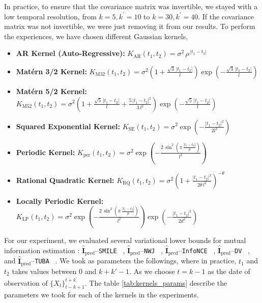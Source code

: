 \documentclass{article}
\begin{document}
 In practice, to ensure that the covariance matrix was invertible, we stayed with a low temporal resolution, from $k=5, k^\prime=10$ to $k=30, k^\prime=40$. If the covariance matrix was not invertible, we were just removing it from our results. To perform the experiences, we have chosen different Gaussian kernels, 
 \begin{itemize}
    \item \textbf{AR Kernel (Auto-Regressive):} $K_{\mathrm{AR}}(t_1,t_2) = \sigma^2 \, \rho^{\,|t_1-t_2|}$
    \item \textbf{Matérn 3/2 Kernel:} $ K_{\mathrm{M32}}(t_1,t_2) = \sigma^2 \left(1 + \frac{\sqrt{3}\,|t_1-t_2|}{l}\right) \exp\!\left(-\frac{\sqrt{3}\,|t_1-t_2|}{l}\right)$
  
    \item \textbf{Matérn 5/2 Kernel:} $K_{\mathrm{M52}}(t_1,t_2) = \sigma^2 \left(1 + \frac{\sqrt{5}\,|t_1-t_2|}{l} + \frac{5\,|t_1-t_2|^2}{3\,l^2}\right) \exp\!\left(-\frac{\sqrt{5}\,|t_1-t_2|}{l}\right)$
    
    \item \textbf{Squared Exponential Kernel:} $ K_{\mathrm{SE}}(t_1,t_2) = \sigma^2 \exp\!\left(-\frac{|t_1-t_2|^2}{2l^2}\right)$
    \item \textbf{Periodic Kernel:} $ K_{\mathrm{per}}(t_1,t_2) = \sigma^2 \exp\!\left(-\frac{2\,\sin^2\!\left(\pi\,\frac{|t_1-t_2|}{p}\right)}{l^2}\right)$
    \item \textbf{Rational Quadratic Kernel:} $  K_{\mathrm{RQ}}(t_1,t_2) = \sigma^2 \left(1 + \frac{|t_1-t_2|^2}{2\theta\,l^2}\right)^{-\theta}$
    \item \textbf{Locally Periodic Kernel:} $ K_{\mathrm{LP}}(t_1,t_2) = \sigma^2 \exp\!\left(-\frac{2\,\sin^2\!\left(\pi\,\frac{|t_1-t_2|}{p}\right)}{l^2}\right) \exp\!\left(-\frac{|t_1-t_2|^2}{2d^2}\right)$
\end{itemize}
For our experiment, we evaluated several variational lower bounds for mutual information estimation : $\hat{\mathbf{I}}_{\text{pred}}$--\texttt{SMILE}
~\cite{song2019understanding}, $\hat{\mathbf{I}}_{\text{pred}}$--\texttt{NWJ}
~\cite{nguyen2010estimating}, $\hat{\mathbf{I}}_{\text{pred}}$--\texttt{InfoNCE}
~\cite{oord2018representation}, $\hat{\mathbf{I}}_{\text{pred}}$--\texttt{DV}
~\cite{belghazi2018mine}, and $\hat{\mathbf{I}}_{\text{pred}}$--\texttt{TUBA}
~\cite{poole2019variational}. 
We took as parameters the followings, where in practice, $t_1$ and $t_2$ takes values between $0$ and $k+k\prime-1$. As we choose $t=k-1$ as the date of observation of $\{X_{t}\}_{t-k+1}^{t+k^\prime}$. The table \ref{tab:kernels_params} describe the parameters we took for each of the kernels in the experiments.
\end{document}
